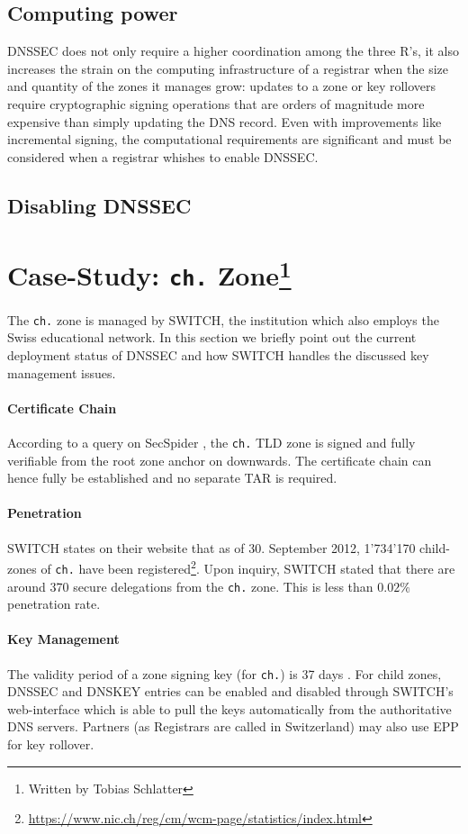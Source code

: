 \documentclass[a4paper,twocolumn]{scrartcl}
\newcommand{\wbts}{\protect\footnote{Written by Tobias Schlatter}}
\begin{document}
\subsection{Computing power}
DNSSEC does not only require a higher coordination among the three R's, it also increases the strain on the computing infrastructure of a registrar when the size and quantity of the  zones it manages grow: updates to a zone or key rollovers require cryptographic signing operations that are orders of magnitude more expensive than simply updating the DNS record. Even with improvements like incremental signing, the computational requirements are significant and must be considered when a registrar whishes to enable DNSSEC.

\subsection{Disabling DNSSEC}

\section{Case-Study: \texttt{ch.} Zone\wbts}
\label{sec:case-study}

The \verb|ch.| zone is managed by SWITCH, the institution which also
employs the Swiss educational network. In this section we briefly
point out the current deployment status of DNSSEC and how SWITCH
handles the discussed key management issues.

\paragraph{Certificate Chain} According to a query on SecSpider
\cite{secspider}, the \verb|ch.| TLD zone is signed and fully
verifiable from the root zone anchor on downwards. The certificate
chain can hence fully be established and no separate TAR is required.

\paragraph{Penetration} SWITCH states on their website that as of
30. September 2012, 1'734'170 child-zones of \verb|ch.| have been
registered\footnote{\url{https://www.nic.ch/reg/cm/wcm-page/statistics/index.html}}. Upon
inquiry, SWITCH stated that there are around 370 secure delegations
from the \verb|ch.| zone. This is less than $0.02\%$ penetration
rate.

\paragraph{Key Management} The validity period of a zone signing key
(for \verb|ch.|) is 37 days \cite{switch10}. For child zones,  DNSSEC
and DNSKEY entries can be enabled and disabled through SWITCH's 
web-interface which is able to pull the keys automatically from the
authoritative DNS servers. Partners (as Registrars are called in
Switzerland) may also use EPP for key rollover.
\end{document}
